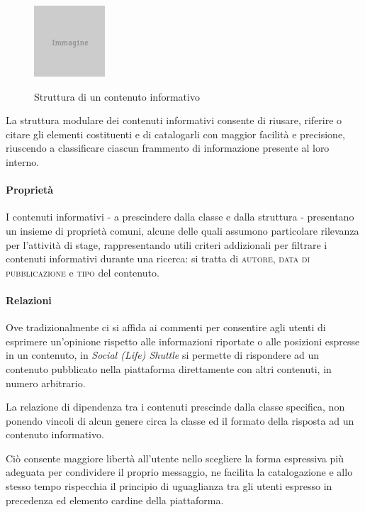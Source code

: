 \begin{figure}[ht]
	\begin{center}
		\includegraphics{img/placeholder.png}
		\label{fig:tesi:progetto:contenuti-informativi}
		\caption{Struttura di un contenuto informativo}
	\end{center}
\end{figure}

La struttura modulare dei contenuti informativi consente di riusare, riferire o citare gli elementi costituenti e di catalogarli con maggior facilità e precisione, riuscendo a classificare ciascun frammento di informazione presente al loro interno.

\paragraph{Proprietà}
I contenuti informativi - a prescindere dalla classe e dalla struttura - presentano un insieme di proprietà comuni, alcune delle quali assumono particolare rilevanza per l'attività di stage, rappresentando utili criteri addizionali per filtrare i contenuti informativi durante una ricerca: si tratta di \textsc{autore}, \textsc{data di pubblicazione} e \textsc{tipo} del contenuto.

\paragraph{Relazioni}
Ove tradizionalmente ci si affida ai commenti per consentire agli utenti di esprimere un'opinione rispetto alle informazioni riportate o alle posizioni espresse in un contenuto, in \textit{Social (Life) Shuttle} si permette di rispondere ad un contenuto pubblicato nella piattaforma direttamente con altri contenuti, in numero arbitrario.

La relazione di dipendenza tra i contenuti prescinde dalla classe specifica, non ponendo vincoli di alcun genere circa la classe ed il formato della risposta ad un contenuto informativo.

Ciò consente maggiore libertà all'utente nello scegliere la forma espressiva più adeguata per condividere il proprio messaggio, ne facilita la catalogazione e allo stesso tempo rispecchia il principio di uguaglianza tra gli utenti espresso in precedenza ed elemento cardine della piattaforma.

